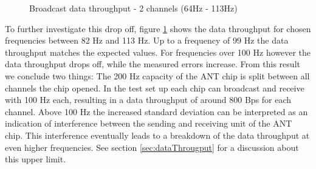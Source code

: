 \begin{description}
\begin{figure}[H]
			\caption{Broadcast data throughput - 2 channels (64Hz - 113Hz)}\label{fig:exp2high}
		\end{figure}
	To further investigate this drop off, figure \ref{fig:exp2high} shows the data throughput for chosen frequencies between 82 Hz and 113 Hz. Up to a frequency of 99 Hz the data throughput matches the expected values. For frequencies over 100 Hz however the data throughput drops off, while the measured errors increase. From this result we conclude two things: The 200 Hz capacity of the ANT chip is split between all channels the chip opened. In the test set up each chip can broadcast and receive with 100 Hz each, resulting in a data throughput of around 800 Bps for each channel. Above 100 Hz the increased standard deviation can be interpreted as an indication of interference between the sending and receiving unit of the ANT chip. This interference eventually leads to a breakdown of the data throughput at even higher frequencies.	
	See section \ref{sec:dataThrougput} for a discussion about this upper limit. 	
	
\end{description}
\newpage


